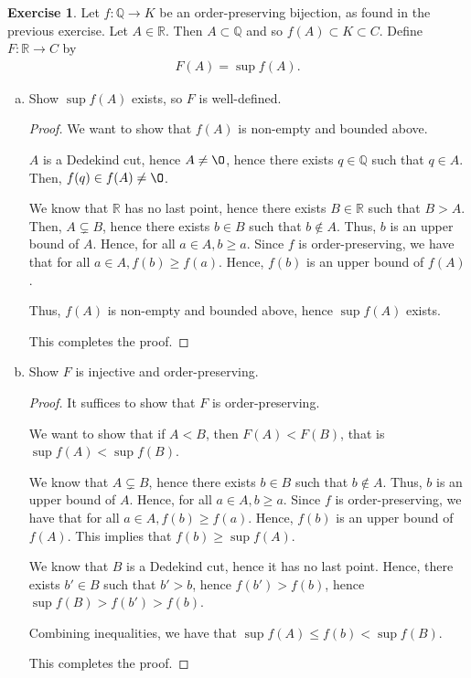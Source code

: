 \documentclass[11pt]{article}
\newcommand{\bbQ}{\mathbb{Q}}
\newcommand{\bbR}{\mathbb{R}}
\renewcommand{\emptyset}{\O}
\newcommand{\arr}{\longrightarrow}
\theoremstyle{definition}
\newtheorem{exercise}[theorem]{Exercise}
\numberwithin{equation}{subsection}
\begin{document}
\begin{exercise}
	Let $f\colon \bbQ \arr K$ be an order-preserving bijection, as found in the previous exercise. Let $A \in \bbR$. Then $A \subset \bbQ$ and so $f(A) \subset K \subset C$. Define $F\colon \bbR \arr C$ by 
	\begin{align*}
		F(A) = \sup f(A).
	\end{align*}
	\begin{enumerate}[(a)]
		\item Show $\sup f(A)$ exists, so $F$ is well-defined.
\begin{proof}
We want to show that $f(A)$ is non-empty and bounded above.

$A$ is a Dedekind cut, hence $A \neq \emptyset$, hence there exists $q \in \bbQ$ such that $q \in A$. Then, $f(q) \in f(A) \neq \emptyset$.

We know that $\bbR$ has no last point, hence there exists $B\in \bbR$ such that $B>A$. Then, $A \subsetneq B$, hence there exists $b \in B$ such that $b \notin A$. Thus, $b$ is an upper bound of $A$. Hence, for all $a \in A, b \geq a$. Since $f$ is order-preserving, we have that for all $a \in A, f(b) \geq f(a)$. Hence, $f(b)$ is an upper bound of $f(A)$.

Thus, $f(A)$ is non-empty and bounded above, hence $\sup f(A)$ exists. 

This completes the proof.


\renewcommand\qedsymbol{QED}
\end{proof}
		
		\item Show $F$ is injective and order-preserving.
\begin{proof}
It suffices to show that $F$ is order-preserving.

We want to show that if $A<B$, then $F(A)<F(B)$, that is $\sup f(A) < \sup f(B)$. 

We know that $A \subsetneq B$, hence there exists $b \in B$ such that $b \notin A$. Thus, $b$ is an upper bound of $A$. Hence, for all $a \in A, b \geq a$. Since $f$ is order-preserving, we have that for all $a \in A, f(b) \geq f(a)$. Hence, $f(b)$ is an upper bound of $f(A)$. This implies that $f(b) \geq \sup f(A)$.

We know that $B$ is a Dedekind cut, hence it has no last point. Hence, there exists $b' \in B$ such that $b'>b$, hence $f(b')>f(b)$, hence $\sup f(B)>f(b')>f(b)$. 

Combining inequalities, we have that $\sup f(A) \leq f(b) < \sup f(B)$. 

This completes the proof.

\renewcommand\qedsymbol{QED}
\end{proof}
		
	\end{enumerate}
\end{exercise}
\end{document}
